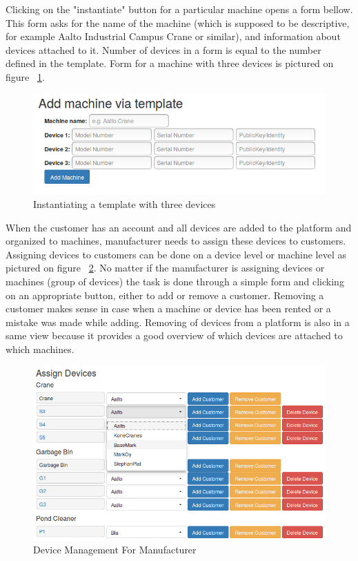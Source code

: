 Clicking on the "instantiate" button for a particular machine opens a form bellow. This form asks for the name of the machine (which is supposed to be descriptive, for example Aalto Industrial Campus Crane or similar), and information about devices attached to it. Number of devices in a form is equal to the number defined in the template. Form for a machine with three devices is pictured on figure ~\ref{fig:AddMachineViaTemplate}.

\begin{figure}[ht]
	\begin{center}
		\includegraphics[width=\textwidth]{images/implementation/AddMachineViaTemplate}
		\caption{Instantiating a template with three devices}
		\label{fig:AddMachineViaTemplate}
	\end{center}
\end{figure}

When the customer has an account and all devices are added to the platform and organized to machines, manufacturer needs to assign these devices to customers. Assigning devices to customers can be done on a device level or machine level as pictured on figure ~\ref{fig:ManageDevicesCompany}. No matter if the manufacturer is assigning devices or machines (group of devices) the task is done through a simple form and clicking on an appropriate button, either to add or remove a customer. Removing a customer makes sense in case when a machine or device has been rented or a mistake was made while adding. Removing of devices from a platform is also in a same view because it provides a good overview of which devices are attached to which machines.

\begin{figure}[ht]
	\begin{center}
		\includegraphics[width=\textwidth]{images/implementation/ManageDevicesCompany}
		\caption{Device Management For Manufacturer}
		\label{fig:ManageDevicesCompany}
	\end{center}
\end{figure}	


